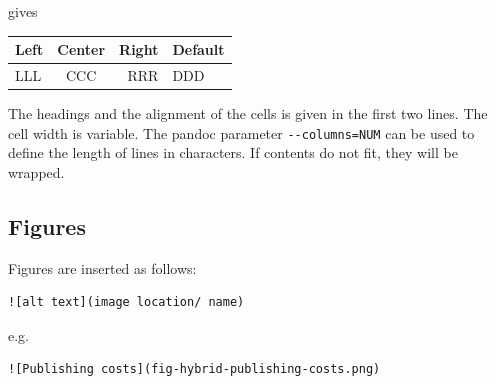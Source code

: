 \documentclass[10pt,fleqn]{wlpeerj}
\begin{document}
gives

\begin{longtable}[]{@{}lcrl@{}}
\toprule
\begin{minipage}[b]{0.17\columnwidth}\raggedright\strut
Left
\strut\end{minipage}
&
\begin{minipage}[b]{0.24\columnwidth}\centering\strut
Center
\strut\end{minipage}
&
\begin{minipage}[b]{0.20\columnwidth}\raggedleft\strut
Right
\strut\end{minipage}
&
\begin{minipage}[b]{0.27\columnwidth}\raggedright\strut
Default
\strut\end{minipage}\tabularnewline
\midrule
\endhead
\begin{minipage}[t]{0.17\columnwidth}\raggedright\strut
LLL
\strut\end{minipage}
&
\begin{minipage}[t]{0.24\columnwidth}\centering\strut
CCC
\strut\end{minipage}
&
\begin{minipage}[t]{0.20\columnwidth}\raggedleft\strut
RRR
\strut\end{minipage}
&
\begin{minipage}[t]{0.27\columnwidth}\raggedright\strut
DDD
\strut\end{minipage}\tabularnewline
\bottomrule
\end{longtable}

The
headings
and
the
alignment
of
the
cells
is
given
in
the
first
two
lines.
The
cell
width
is
variable.
The
pandoc
parameter
\texttt{-\/-columns=NUM}
can
be
used
to
define
the
length
of
lines
in
characters.
If
contents
do
not
fit,
they
will
be
wrapped.

\subsection{Figures}\label{figures}

Figures
are
inserted
as
follows:

\begin{verbatim}
![alt text](image location/ name)
\end{verbatim}

e.g.

\begin{verbatim}
![Publishing costs](fig-hybrid-publishing-costs.png)
\end{verbatim}
\end{document}
